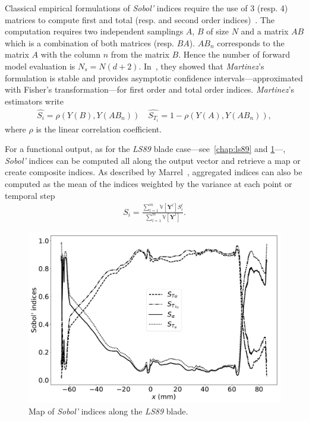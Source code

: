 Classical empirical formulations of \emph{Sobol'} indices require the use of 3 (resp. 4) matrices to compute first and total (resp. and second order indices)~\cite{Saltelli2010}. The computation requires two independent samplings $A$, $B$ of size $N$ and a matrix $AB$ which is a combination of both matrices (resp. $BA$). $AB_{n}$ corresponds to the matrix $A$ with the column $n$ from the matrix $B$. Hence the number of forward model evaluation is $N_s = N(d + 2)$. In~\citep{baudin2016}, they showed that \textit{Martinez}'s formulation is stable and provides asymptotic confidence intervals---approximated with Fisher's transformation---for first order and total order indices. \textit{Martinez}'s estimators write
\begin{align}
\hat{S_i} = \rho (Y(B), Y(AB_{n})) \quad \hat{S_{T_i}} = 1 - \rho (Y(A), Y(AB_n)),
\end{align}
\noindent where $\rho$ is the linear correlation coefficient.

For a functional output, as for the \textit{LS89} blade case---see~\cref{chap:ls89} and \cref{fig:map_sobol}---, \textit{Sobol'} indices can be computed all along the output vector and retrieve a map or create composite indices. As described by Marrel~\cite{marrel2015}, aggregated indices can also be computed as the mean of the indices weighted by the variance at each point or temporal step
\begin{align}
S_i = \frac{\displaystyle\sum_{l = 1}^{m} \mathbb{V} [\mathbf{Y}^l] S_i^{l}}{\displaystyle\sum_{l = 1}^{m} \mathbb{V} [\mathbf{Y}^l]}.
\end{align}

\begin{figure}[H]
\centering
\includegraphics[width=0.8\linewidth,keepaspectratio]{fig/literature/sobol_map.pdf}
\caption{Map of \emph{Sobol'} indices along the \textit{LS89} blade.}
\label{fig:map_sobol}
\end{figure}

